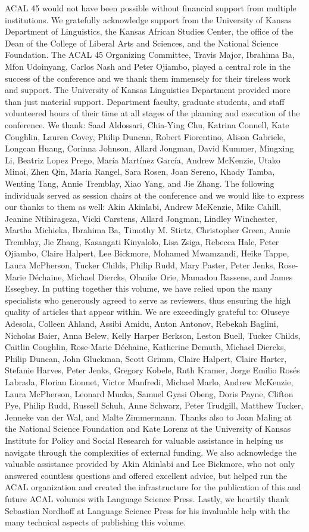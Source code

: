 ACAL 45 would not have been possible without financial support from multiple institutions.  We gratefully acknowledge support from the University of Kansas Department of Linguistics, the Kansas African Studies Center, the office of the Dean of the College of Liberal Arts and Sciences, and the National Science Foundation.  The ACAL 45 Organizing Committee, Travis Major, Ibrahima Ba, Mfon Udoinyang, Carlos Nash and Peter Ojiambo, played a central role in the success of the conference and we thank them immensely for their tireless work and support.  The University of Kansas Linguistics Department provided more than just material support.  Department faculty, graduate students, and staff volunteered hours of their time at all stages of the planning and execution of the conference. We thank: Saad Aldossari, Chia-Ying Chu, Katrina Connell, Kate Coughlin, Lauren Covey, Philip Duncan, Robert Fiorentino, Alison Gabriele, Longcan Huang, Corinna Johnson, Allard Jongman, David Kummer, Mingxing Li, Beatriz Lopez Prego, María Martínez García, Andrew McKenzie, Utako Minai, Zhen Qin, Maria Rangel, Sara Rosen, Joan Sereno, Khady Tamba, Wenting Tang, Annie Tremblay, Xiao Yang, and Jie Zhang.  The following individuals served as session chairs at the conference and we would like to express our thanks to them as well: Akin Akinlabi, Andrew McKenzie, Mike Cahill, Jeanine Ntihirageza, Vicki Carstens, Allard Jongman, Lindley Winchester, Martha Michieka, Ibrahima Ba, Timothy M. Stirtz, Christopher Green, Annie Tremblay, Jie Zhang, Kasangati Kinyalolo, Lisa Zsiga, Rebecca Hale, Peter Ojiambo, Claire Halpert, Lee Bickmore, Mohamed Mwamzandi, Heike Tappe, Laura McPherson, Tucker Childs, Philip Rudd, Mary Paster, Peter Jenks, Rose-Marie Déchaine, Michael Diercks, Olanike Orie, Mamadou Bassene, and James Essegbey.  In putting together this volume, we have relied upon the many specialists who generously agreed to serve as reviewers, thus ensuring the high quality of articles that appear within.  We are exceedingly grateful to: Oluseye Adesola, Colleen Ahland, Assibi Amidu, Anton Antonov, Rebekah Baglini, Nicholas Baier, Anna Belew, Kelly Harper Berkson, Leston Buell, Tucker Childs, Caitlin Coughlin, Rose-Marie Déchaine, Katherine Demuth, Michael Diercks, Philip Duncan, John Gluckman, Scott Grimm, Claire Halpert, Claire Harter, Stefanie Harves, Peter Jenks, Gregory Kobele, Ruth Kramer, Jorge Emilio Rosés Labrada, Florian Lionnet, Victor Manfredi, Michael Marlo, Andrew McKenzie, Laura McPherson, Leonard Muaka, Samuel Gyasi Obeng, Doris Payne, Clifton Pye, Philip Rudd, Russell Schuh, Anne Schwarz, Peter Trudgill, Matthew Tucker, Jenneke van der Wal, and Malte Zimmermann.  Thanks also to Joan Maling at the National Science Foundation and Kate Lorenz at the University of Kansas Institute for Policy and Social Research for valuable assistance in helping us navigate through the complexities of external funding.  We also acknowledge the valuable assistance provided by Akin Akinlabi and Lee Bickmore, who not only answered countless questions and offered excellent advice, but helped run the ACAL organization and created the infrastructure for the publication of this and future ACAL volumes with Language Science Press.  Lastly, we heartily thank Sebastian Nordhoff at Language Science Press for his invaluable help with the many technical aspects of publishing this volume.

 